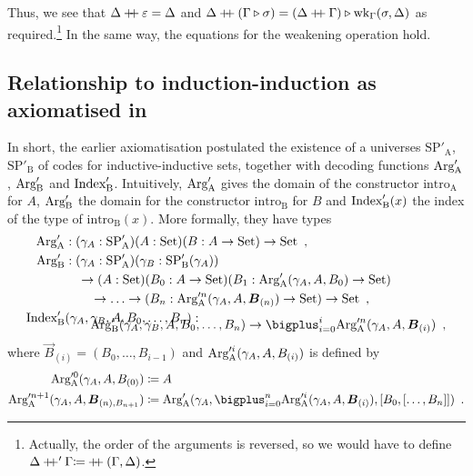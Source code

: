 \documentclass[orivec,envcountsame, ,envcountsect]{llncs}
\begin{document}
Thus, we see that $\Delta \mathbin{+\mkern-6mu+} \varepsilon = \Delta$ and $\Delta
\mathbin{+\mkern-6mu+} (\Gamma \triangleright \sigma) = (\Delta
  \mathbin{+\mkern-6mu+} \Gamma) \triangleright \text{wk}_{\Gamma}(\sigma, \Delta)$ as
required.\footnote{Actually, the order of the arguments is reversed,
  so we would have to define \\$\Delta \mathbin{+\mkern-6mu+}' \Gamma {\coloneqq}
  \mathbin{+\mkern-6mu+}(\Gamma, \Delta)$.} In the same way, the equations for
the weakening operation hold.


\subsection{Relationship to induction-induction as axiomatised in \cite{nordvallforsbergSetzer2010indind}} %
\label{sec:functors-CSL-article}

In short, the earlier
axiomatisation \cite{nordvallforsbergSetzer2010indind} postulated the
existence of a universes $\text{SP}'_{\text{A}}$,
$\text{SP}'_{\text{B}}$ of codes for inductive-inductive sets,
together with decoding functions $\text{Arg}_{\text{A}}'$, $\text{Arg}_{\text{B}}'$ and
$\text{Index}'_{\text{B}}$. Intuitively, $\text{Arg}_{\text{A}}'$ gives the domain of the
constructor $\text{intro}_{\text{A}}$ for $A$, $\text{Arg}_{\text{B}}'$ the domain
for the constructor $\text{intro}_{\text{B}}$ for $B$ and
$\text{Index}'_{\text{B}}(x)$ the index of the type of $\text{intro}_{\text{B}}(x)$. More formally, they have types
\begin{align*}
\CSLArgA &: (\gamma_A : \text{SP}'_{\text{A}})(A : \Set)(B : A \to \Set) \to \Set \enspace ,\\
\CSLArgB &: (\gamma_A : \text{SP}'_{\text{A}})(\gamma_B : \text{SP}'_{\text{B}}(\gamma_A)) \\
       & \quad \to (A : \Set)(B_0 : A \to \Set)(B_1 : \CSLArgA(\gamma_A, A, B_0) \to \Set) \\
       & \qquad \to \ldots \to (B_n : \CSLArgA^n(\gamma_A, A, \vec{B}_{(n)}) \to \Set) \to \Set \enspace , \\
\CSLIndex&(\gamma_A, \gamma_B, A, B_0, \ldots, B_n) : \\ \noalign{\vskip -4mm}
              &  \qquad \CSLArgB(\gamma_A, \gamma_B, A, B_0, \ldots, B_n) \to \bigplus_{i = 0}^i \CSLArgA^n(\gamma_A, A, \vec{B}_{(i)}) \enspace ,
\end{align*} 
where $\vec{B}_{(i)} = (B_0, \ldots, B_{i - 1})$ and $\text{Arg}_{\text{A}}'^i(\gamma_A, A, B_{(i)})$ is defined by
\begin{align*}
  \CSLArgA^0(\gamma_A, A, B_{(0)}) &\coloneqq A \\
  \CSLArgA^{n + 1}(\gamma_A, A, \vec{B}_{(n), B_{n + 1}}) &\coloneqq \CSLArgA(\gamma_A, \bigplus_{i = 0}^n \CSLArgA^i(\gamma_A, A, \vec{B}_{(i)}), \coprodmorph{B_0}{\coprodmorph{\ldots}{B_n}}) \enspace .
\end{align*}
\end{document}
